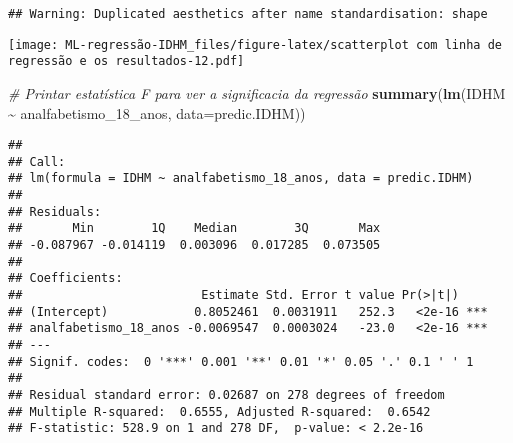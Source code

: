 \documentclass[
]{article}
\newenvironment{Shaded}{\begin{snugshade}}{\end{snugshade}}
\newcommand{\AttributeTok}[1]{\textcolor[rgb]{0.13,0.29,0.53}{#1}}
\newcommand{\CommentTok}[1]{\textcolor[rgb]{0.56,0.35,0.01}{\textit{#1}}}
\newcommand{\FunctionTok}[1]{\textcolor[rgb]{0.13,0.29,0.53}{\textbf{#1}}}
\newcommand{\NormalTok}[1]{#1}
\newcommand{\SpecialCharTok}[1]{\textcolor[rgb]{0.81,0.36,0.00}{\textbf{#1}}}
\begin{document}
\begin{verbatim}
## Warning: Duplicated aesthetics after name standardisation: shape
\end{verbatim}

\texttt{[image: ML-regressão-IDHM\_files/figure-latex/scatterplot com linha de regressão e os resultados-12.pdf]}

\begin{Shaded}
\begin{Highlighting}[]
\CommentTok{\# Printar estatística F para ver a significacia da regressão}
\FunctionTok{summary}\NormalTok{(}\FunctionTok{lm}\NormalTok{(IDHM }\SpecialCharTok{\textasciitilde{}}\NormalTok{ analfabetismo\_18\_anos, }\AttributeTok{data=}\NormalTok{predic.IDHM))}
\end{Highlighting}
\end{Shaded}

\begin{verbatim}
## 
## Call:
## lm(formula = IDHM ~ analfabetismo_18_anos, data = predic.IDHM)
## 
## Residuals:
##       Min        1Q    Median        3Q       Max 
## -0.087967 -0.014119  0.003096  0.017285  0.073505 
## 
## Coefficients:
##                         Estimate Std. Error t value Pr(>|t|)    
## (Intercept)            0.8052461  0.0031911   252.3   <2e-16 ***
## analfabetismo_18_anos -0.0069547  0.0003024   -23.0   <2e-16 ***
## ---
## Signif. codes:  0 '***' 0.001 '**' 0.01 '*' 0.05 '.' 0.1 ' ' 1
## 
## Residual standard error: 0.02687 on 278 degrees of freedom
## Multiple R-squared:  0.6555, Adjusted R-squared:  0.6542 
## F-statistic: 528.9 on 1 and 278 DF,  p-value: < 2.2e-16
\end{verbatim}
\end{document}
